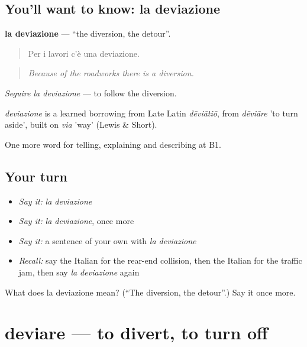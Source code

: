 \subsection*{You'll want to know: la deviazione}
\textbf{la deviazione} — \textquotedblleft{}the diversion, the detour\textquotedblright{}.

\begin{quote}
Per i lavori c'è una deviazione.
\end{quote}

\begin{quote}
\emph{Because of the roadworks there is a diversion.}
\end{quote}

\emph{Seguire la deviazione} — to follow the diversion.

\begin{cousinweb}
\emph{deviazione} is a learned borrowing from Late Latin \emph{dēviātiō}, from \emph{dēviāre} 'to turn aside', built on \emph{via} 'way' (Lewis \& Short).
\end{cousinweb}

\begin{grammarlens}[title={What you've built}]
One more word for telling, explaining and describing at B1.
\end{grammarlens}

\subsection*{Your turn}
\begin{itemize}
\raggedright
  \item \emph{Say it:} \emph{la deviazione}
  \item \emph{Say it:} \emph{la deviazione}, once more
  \item \emph{Say it:} a sentence of your own with \emph{la deviazione}
  \item \emph{Recall:} say the Italian for the rear-end collision, then the Italian for the traffic jam, then say \emph{la deviazione} again
\end{itemize}

\begin{tcolorbox}[breakable,colback=teal!4,colframe=teal!35!black,title={Before you move on}]
What does la deviazione mean? (\textquotedblleft{}The diversion, the detour\textquotedblright{}.) Say it once more.
\end{tcolorbox}
\section[deviare]{deviare — to divert, to turn off}

